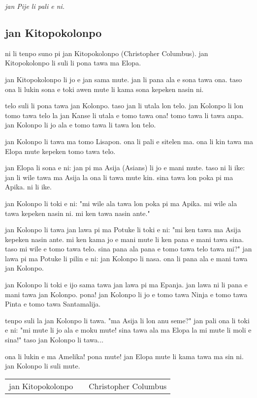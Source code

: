 \textit{jan Pije li pali e ni. \cite{www:Pije:01}}
%
\newpage
\subsection{jan Kitopokolonpo}

ni li tenpo suno pi jan Kitopokolonpo (Christopher Columbus). 
jan Kitopokolonpo li suli li pona tawa ma Elopa.

jan Kitopokolonpo li jo e jan sama mute. 
jan li pana ala e sona tawa ona. 
taso ona li lukin sona e toki awen mute li kama sona kepeken nasin ni.

telo suli li pona tawa jan Kolonpo. 
taso jan li utala lon telo. 
jan Kolonpo li lon tomo tawa telo la jan Kanse li utala e tomo tawa ona!
tomo tawa li tawa anpa. jan Kolonpo li jo ala e tomo tawa li tawa lon
telo.

jan Kolonpo li tawa ma tomo Lisapon. ona li pali e sitelen ma. ona li
kin tawa ma Elopa mute kepeken tomo tawa telo.

jan Elopa li sona e ni: jan pi ma Asija (Asians) li jo e mani mute.
taso ni li ike: jan li wile tawa ma Asija la ona li tawa mute kin.
sina tawa lon poka pi ma Apika. ni li ike.

jan Kolonpo li toki e ni: "mi wile ala tawa lon poka pi ma Apika. mi
wile ala tawa kepeken nasin ni. mi ken tawa nasin ante."

jan Kolonpo li tawa jan lawa pi ma Potuke li toki e ni: "mi ken tawa
ma Asija kepeken nasin ante. mi ken kama jo e mani mute li ken pana e
mani tawa sina. taso mi wile e tomo tawa telo. sina pana ala pana e
tomo tawa telo tawa mi?" jan lawa pi ma Potuke li pilin e ni: jan
Kolonpo li nasa. ona li pana ala e mani tawa jan Kolonpo.

jan Kolonpo li toki e ijo sama tawa jan lawa pi ma Epanja. jan lawa
ni li pana e mani tawa jan Kolonpo. pona! jan Kolonpo li jo e tomo
tawa Ninja e tomo tawa Pinta e tomo tawa Santamalija.

tenpo suli la jan Kolonpo li tawa. "ma Asija li lon anu seme?" jan
pali ona li toki e ni: "mi mute li jo ala e moku mute! sina tawa ala
ma Elopa la mi mute li moli e sina!" taso jan Kolonpo li tawa...

ona li lukin e ma Amelika! pona mute! jan Elopa mute li kama tawa ma
sin ni. jan Kolonpo li suli mute.

\begin{supertabular}{p{5,5cm}|ll}
jan Kitopokolonpo && Christopher Columbus \\
\end{supertabular}

